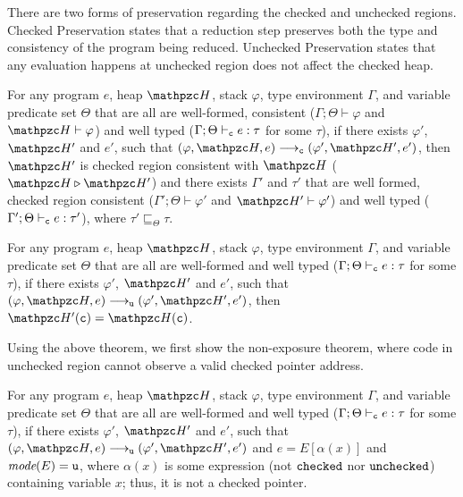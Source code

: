 \noindent
There are two forms of preservation regarding the checked and unchecked regions.
Checked Preservation states that a reduction step preserves both the
type and consistency of the program being reduced.
Unchecked Preservation states that any evaluation happens at unchecked region does not affect the checked heap.

\begin{thm}
For any \lang program $e$, heap $\heap$, stack
$\varphi$, type environment $\Gamma$, and variable predicate set $\Theta$
that are all are well-formed, consistent
($\Gamma;\Theta\vdash \varphi$ and $\heap \vdash \varphi$) and well
typed ($\Gamma;\Theta\vdash_{\texttt{c}} e : \tau$ for some $\tau$), if there exists $\varphi'$,
$\heap'$ and $e'$, such that $(\varphi,\heap,e)
\longrightarrow_{\cmode} (\varphi',\heap',e')$, then $\heap'$ is
checked region consistent with $\heap$ ($\heap \triangleright \heap'$) and there exists
$\Gamma'$ and $\tau'$ that are well formed, checked region consistent
($\Gamma';\Theta\vdash \varphi'$ and $\heap' \vdash \varphi'$) and
well typed ($\Gamma';\Theta \vdash_{\texttt{c}} e: \tau'$), where
$\tau'\sqsubseteq_{\Theta} \tau$.
\end{thm}
\begin{thm}
For any \lang program $e$, heap $\heap$, stack
$\varphi$, type environment $\Gamma$, and variable predicate set $\Theta$
that are all are well-formed and well
typed ($\Gamma;\Theta\vdash_{\texttt{c}} e : \tau$ for some $\tau$), if there exists $\varphi'$,
$\heap'$ and $e'$, such that $(\varphi,\heap,e)
\longrightarrow_{\umode} (\varphi',\heap',e')$, then $\heap'(\cmode)=\heap(\cmode)$.
\end{thm}

Using the above theorem, we first show the non-exposure theorem,
where code in unchecked region cannot observe a valid checked pointer address.

\begin{thm}
For any \lang program $e$, heap $\heap$, stack
$\varphi$, type environment $\Gamma$, and variable predicate set $\Theta$
that are all are well-formed and well
typed ($\Gamma;\Theta\vdash_{\texttt{c}} e : \tau$ for some $\tau$), if there exists $\varphi'$,
$\heap'$ and $e'$, such that $(\varphi,\heap,e)
\longrightarrow_{\umode} (\varphi',\heap',e')$ and $e=E[\alpha(x)]$ and $\textit{mode}(E)=\texttt{u}$,
where $\alpha(x)$ is some expression (not $\mathtt{checked}$ nor $\mathtt{unchecked}$) containing variable $x$; 
thus, it is not a checked pointer.
\end{thm}

